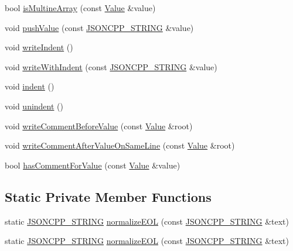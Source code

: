 \begin{DoxyCompactItemize}
\item 
bool \hyperlink{class_json_1_1_styled_stream_writer_a88f4d342cf25c73aabf77c1b8ba01e44}{is\+Multine\+Array} (const \hyperlink{class_json_1_1_value}{Value} \&value)
\item 
void \hyperlink{class_json_1_1_styled_stream_writer_a9adb47185695f07b1979d8f4c5347592}{push\+Value} (const \hyperlink{config_8h_a1e723f95759de062585bc4a8fd3fa4be}{J\+S\+O\+N\+C\+P\+P\+\_\+\+S\+T\+R\+I\+NG} \&value)
\item 
void \hyperlink{class_json_1_1_styled_stream_writer_a5a52fa5b406f1580a61dde3b5638e76d}{write\+Indent} ()
\item 
void \hyperlink{class_json_1_1_styled_stream_writer_a4e64789373b359c9b7a7244509b918fc}{write\+With\+Indent} (const \hyperlink{config_8h_a1e723f95759de062585bc4a8fd3fa4be}{J\+S\+O\+N\+C\+P\+P\+\_\+\+S\+T\+R\+I\+NG} \&value)
\item 
void \hyperlink{class_json_1_1_styled_stream_writer_ab49409578422aa73b060e3492dd6c72a}{indent} ()
\item 
void \hyperlink{class_json_1_1_styled_stream_writer_a74d8fb9beecd29759d7b79f430386358}{unindent} ()
\item 
void \hyperlink{class_json_1_1_styled_stream_writer_a79c3c2b320475035c47b2db484a3e434}{write\+Comment\+Before\+Value} (const \hyperlink{class_json_1_1_value}{Value} \&root)
\item 
void \hyperlink{class_json_1_1_styled_stream_writer_ad2ca860e317ca91d6b2932535b4ce9c7}{write\+Comment\+After\+Value\+On\+Same\+Line} (const \hyperlink{class_json_1_1_value}{Value} \&root)
\item 
bool \hyperlink{class_json_1_1_styled_stream_writer_ad2892f57171919fa4f8a5ae5574755cf}{has\+Comment\+For\+Value} (const \hyperlink{class_json_1_1_value}{Value} \&value)
\end{DoxyCompactItemize}
\subsection*{Static Private Member Functions}
\begin{DoxyCompactItemize}
\item 
static \hyperlink{config_8h_a1e723f95759de062585bc4a8fd3fa4be}{J\+S\+O\+N\+C\+P\+P\+\_\+\+S\+T\+R\+I\+NG} \hyperlink{class_json_1_1_styled_stream_writer_ae481322d7a439881b257ba7aeda6d19b}{normalize\+E\+OL} (const \hyperlink{config_8h_a1e723f95759de062585bc4a8fd3fa4be}{J\+S\+O\+N\+C\+P\+P\+\_\+\+S\+T\+R\+I\+NG} \&text)
\item 
static \hyperlink{config_8h_a1e723f95759de062585bc4a8fd3fa4be}{J\+S\+O\+N\+C\+P\+P\+\_\+\+S\+T\+R\+I\+NG} \hyperlink{class_json_1_1_styled_stream_writer_ae481322d7a439881b257ba7aeda6d19b}{normalize\+E\+OL} (const \hyperlink{config_8h_a1e723f95759de062585bc4a8fd3fa4be}{J\+S\+O\+N\+C\+P\+P\+\_\+\+S\+T\+R\+I\+NG} \&text)
\end{DoxyCompactItemize}
